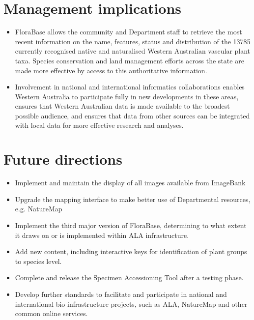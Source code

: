 \documentclass[version=last,
    paper=a4, %
    10pt, %
    usenames,
    dvipsnames,
    oneside, %
    headings=openany, %
    DIV=15 %
]{scrbook}
\begin{document}
\section*{Management implications}
\begin{itemize}
\itemsep1pt\parskip0pt
\item
  FloraBase allows the community and Department staff to retrieve the
  most recent information on the name, features, status and distribution
  of the 13785 currently recognised native and naturalised Western
  Australian vascular plant taxa. Species conservation and land
  management efforts across the state are made more effective by access
  to this authoritative information.
\item
  Involvement in national and international informatics collaborations
  enables Western Australia to participate fully in new developments in
  these areas, ensures that Western Australian data is made available to
  the broadest possible audience, and ensures that data from other
  sources can be integrated with local data for more effective research
  and analyses.
\end{itemize}



\section*{Future directions}
\begin{itemize}
\itemsep1pt\parskip0pt
\item
  Implement and maintain the display of all images available from
  ImageBank
\item
  Upgrade the mapping interface to make better use of Departmental
  resources, e.g. NatureMap
\item
  Implement the third major version of FloraBase, determining to what
  extent it draws on or is implemented within ALA infrastructure.
\item
  Add new content, including interactive keys for identification of
  plant groups to species level.
\item
  Complete and release the Specimen Accessioning Tool after a testing
  phase.
\item
  Develop further standards to facilitate and participate in national
  and international bio-infrastructure projects, such as ALA, NatureMap
  and other common online services.
\end{itemize}



\end{document}
